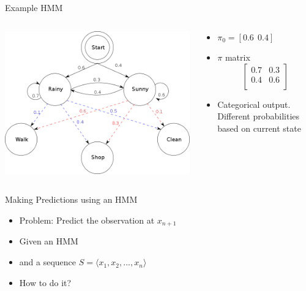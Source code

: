 \documentclass[aspectratio=169]{beamer}
\begin{document}
\begin{frame}{Example HMM}

\begin{columns}
\begin{column}{0.6\textwidth}
\includegraphics[width=1\textwidth]{lectSeq/708px-HMMGraph.png}
\end{column}
\begin{column}{0.4\textwidth}
\begin{itemize}
\item $\pi_0 = [ 0.6\ \ 0.4]$
\item $\pi$ matrix 
\begin{equation}
  \begin{bmatrix}
  0.7 & 0.3 \\\nonumber
  0.4 & 0.6  \\ 
  \end{bmatrix}
\end{equation}
\item Categorical output. Different probabilities based on current state
\end{itemize}
\end{column}
\end{columns}
\end{frame}

\begin{frame}{Making Predictions using an HMM}

\begin{itemize}
\item Problem: Predict the observation at $x_{n+1}$
\item Given an HMM
\item and a sequence $S = \langle x_1, x_2, ..., x_n \rangle$
\item How to do it? 
\end{itemize}

\end{frame}
\end{document}
